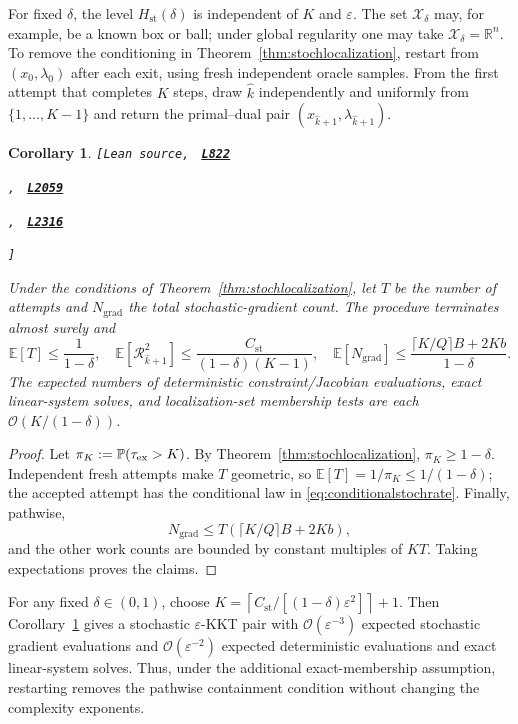 \documentclass[11pt]{article}
\newtheorem{corollary}[theorem]{Corollary}
\theoremstyle{definition}
\theoremstyle{remark}
\numberwithin{equation}{section}
\numberwithin{figure}{section}
\numberwithin{table}{section}
\numberwithin{algorithm}{section}
\newcommand{\E}{\mathbb{E}}
\newcommand{\cO}{\mathcal{O}}
\newcommand{\eps}{\varepsilon}
\newcommand{\leanLinkText}[1]{%
  \underline{\textbf{#1}}%
}
\newcommand{\leanDeclTag}[2]{%
  {\footnotesize\texttt{[Lean source, }}%
  \href{https://github.com/optpku/ReasBook/blob/v4.32.2/ReasBook/Papers/TR_LALM_theory/#1?plain=1\#L#2}%
    {\leanLinkText{\footnotesize\texttt{L#2}}}%
}
\newcommand{\leanDeclTagExtra}[2]{%
  \unskip
  {\footnotesize\texttt{, }}%
  \href{https://github.com/optpku/ReasBook/blob/v4.32.2/ReasBook/Papers/TR_LALM_theory/#1?plain=1\#L#2}%
    {\leanLinkText{\footnotesize\texttt{L#2}}}\allowbreak
}
\newcommand{\leanDeclTagEnd}{%
  \unskip
  {\footnotesize\texttt{]}}\enspace
}
\begin{document}
For fixed \(\delta\), the level \(H_{\mathrm{st}}(\delta)\) is independent of \(K\) and \(\eps\).  The set \(\mathcal X_\delta\) may, for example, be a known box or ball; under global regularity one may take \(\mathcal X_\delta=\mathbb R^n\).  To remove the conditioning in Theorem~\ref{thm:stochlocalization}, restart from $(x_0,\lambda_0)$ after each exit, using fresh independent oracle samples.  From the first attempt that completes $K$ steps, draw $\widehat{k}$ independently and uniformly from $\{1,\ldots,K-1\}$ and return the primal--dual pair $(x_{\widehat{k}+1},\lambda_{\widehat{k}+1})$.

\begin{corollary}
\label{cor:restart}
\leanDeclTag{Corollary_3_8.lean}{822}
\leanDeclTagExtra{Corollary_3_8.lean}{2059}
\leanDeclTagExtra{Corollary_3_8.lean}{2316}
\leanDeclTagEnd
Under the conditions of Theorem~\ref{thm:stochlocalization}, let \(T\) be the
number of attempts and
\(N_{\mathrm{grad}}\) the total stochastic-gradient count.  The procedure
terminates almost surely and
\begin{equation}
    \E[T]\le\frac{1}{1-\delta},\quad
    \E[\mathcal R_{\widehat{k}+1}^2]
    \le\frac{C_{\mathrm{st}}}{(1-\delta)(K-1)},\quad
    \E[N_{\mathrm{grad}}]
    \le\frac{\lceil K/Q\rceil B+2Kb}{1-\delta}.
    \label{eq:restartbounds}
\end{equation}
The expected numbers of deterministic constraint/Jacobian evaluations,
exact linear-system solves, and localization-set membership tests are each
$\cO(K/(1-\delta))$.
\end{corollary}

\begin{proof}
Let \(\pi_K:=\mathbb P(\tau_{\rm ex}>K)\).  By
Theorem~\ref{thm:stochlocalization}, \(\pi_K\ge1-\delta\).  Independent fresh
attempts make \(T\) geometric, so
\(\E[T]=1/\pi_K\le1/(1-\delta)\); the accepted attempt has the conditional
law in \eqref{eq:conditionalstochrate}.  Finally, pathwise,
$$
 N_{\mathrm{grad}}\le
 T(\lceil K/Q\rceil B+2Kb),
$$
and the other work counts are bounded by constant multiples of \(KT\).
Taking expectations proves the claims.
\end{proof}

For any fixed $\delta\in(0,1)$, choose
$K=\left\lceil C_{\mathrm{st}}/[(1-\delta)\eps^2]\right\rceil+1$.
Then Corollary~\ref{cor:restart} gives a stochastic $\eps$-KKT pair with $\cO(\eps^{-3})$ expected stochastic gradient evaluations and $\cO(\eps^{-2})$ expected deterministic evaluations and exact linear-system solves. Thus, under the additional exact-membership assumption, restarting removes the pathwise containment condition without changing the complexity exponents.
\end{document}
